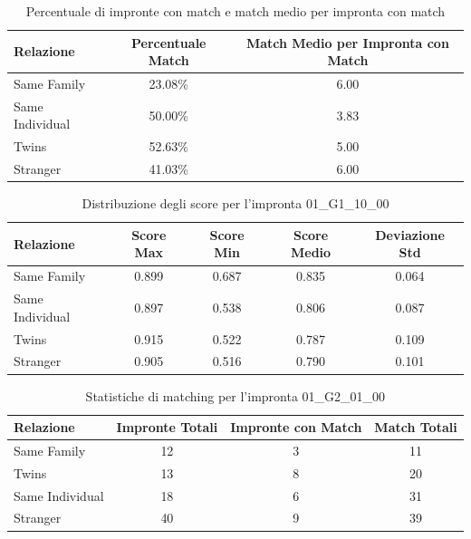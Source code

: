 \begin{table}[htbp]
\centering
\caption{Percentuale di impronte con match e match medio per impronta con match}
\label{tab:match_percentage_01_G1_10_00}
\begin{tabular}{|l|c|c|}
\hline
\textbf{Relazione} & \textbf{Percentuale Match} & \textbf{Match Medio per Impronta con Match} \\
\hline
Same Family & 23.08\% & 6.00 \\
\hline
Same Individual & 50.00\% & 3.83 \\
\hline
Twins & 52.63\% & 5.00 \\
\hline
Stranger & 41.03\% & 6.00 \\
\hline
\end{tabular}
\end{table}


\begin{table}[htbp]
\centering
\caption{Distribuzione degli score per l'impronta 01\_G1\_10\_00}
\label{tab:scores_01_G1_10_00}
\begin{tabular}{|l|c|c|c|c|}
\hline
\textbf{Relazione} & \textbf{Score Max} & \textbf{Score Min} & \textbf{Score Medio} & \textbf{Deviazione Std} \\
\hline
Same Family & 0.899 & 0.687 & 0.835 & 0.064 \\
\hline
Same Individual & 0.897 & 0.538 & 0.806 & 0.087 \\
\hline
Twins & 0.915 & 0.522 & 0.787 & 0.109 \\
\hline
Stranger & 0.905 & 0.516 & 0.790 & 0.101 \\
\hline
\end{tabular}
\end{table}


\begin{table}[htbp]
\centering
\caption{Statistiche di matching per l'impronta 01\_G2\_01\_00}
\label{tab:results_01_G2_01_00}
\begin{tabular}{|l|c|c|c|}
\hline
\textbf{Relazione} & \textbf{Impronte Totali} & \textbf{Impronte con Match} & \textbf{Match Totali} \\
\hline
Same Family & 12 & 3 & 11 \\
\hline
Twins & 13 & 8 & 20 \\
\hline
Same Individual & 18 & 6 & 31 \\
\hline
Stranger & 40 & 9 & 39 \\
\hline
\end{tabular}
\end{table}


